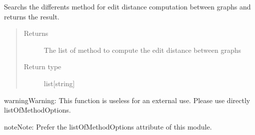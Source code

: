 \documentclass[letterpaper,10pt,english]{sphinxmanual}
\begin{document}
\begin{fulllineitems}
\label{doc:PythonGedLib.PyGetMethodOptions}
Searchs the differents method for edit distance computation between graphs and returns the result.
\begin{quote}\begin{description}
\item[{Returns}] \leavevmode
The list of method to compute the edit distance between graphs

\item[{Return type}] \leavevmode
list{[}string{]}

\end{description}\end{quote}

\begin{notice}{warning}{Warning:}
This function is useless for an external use. Please use directly listOfMethodOptions.
\end{notice}

\begin{notice}{note}{Note:}
Prefer the listOfMethodOptions attribute of this module.
\end{notice}

\end{fulllineitems}

\end{document}
